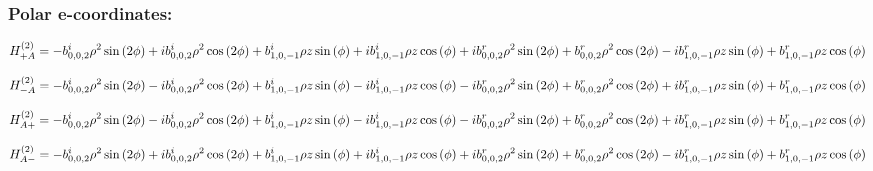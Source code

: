\documentclass[fleqn]{article}
\begin{document}
\subsubsection*{Polar e-coordinates:}

\begin{dmath*}
H_{+A}^{(2)}=- b^{i}_{0,0,2} \rho^{2} \sin{\left (2 \phi \right )} +  i b^{i}_{0,0,2} \rho^{2} \cos{\left (2 \phi \right )} + b^{i}_{1,0,-1} \rho z \sin{\left (\phi \right )} +  i b^{i}_{1,0,-1} \rho z \cos{\left (\phi \right )} +  i b^{r}_{0,0,2} \rho^{2} \sin{\left (2 \phi \right )} + b^{r}_{0,0,2} \rho^{2} \cos{\left (2 \phi \right )} -  i b^{r}_{1,0,-1} \rho z \sin{\left (\phi \right )} + b^{r}_{1,0,-1} \rho z \cos{\left (\phi \right )}\\
\end{dmath*}

\begin{dmath*}
H_{-A}^{(2)}=- b^{i}_{0,0,2} \rho^{2} \sin{\left (2 \phi \right )} -  i b^{i}_{0,0,2} \rho^{2} \cos{\left (2 \phi \right )} + b^{i}_{1,0,-1} \rho z \sin{\left (\phi \right )} -  i b^{i}_{1,0,-1} \rho z \cos{\left (\phi \right )} -  i b^{r}_{0,0,2} \rho^{2} \sin{\left (2 \phi \right )} + b^{r}_{0,0,2} \rho^{2} \cos{\left (2 \phi \right )} +  i b^{r}_{1,0,-1} \rho z \sin{\left (\phi \right )} + b^{r}_{1,0,-1} \rho z \cos{\left (\phi \right )}\\
\end{dmath*}

\begin{dmath*}
H_{A+}^{(2)}=- b^{i}_{0,0,2} \rho^{2} \sin{\left (2 \phi \right )} -  i b^{i}_{0,0,2} \rho^{2} \cos{\left (2 \phi \right )} + b^{i}_{1,0,-1} \rho z \sin{\left (\phi \right )} -  i b^{i}_{1,0,-1} \rho z \cos{\left (\phi \right )} -  i b^{r}_{0,0,2} \rho^{2} \sin{\left (2 \phi \right )} + b^{r}_{0,0,2} \rho^{2} \cos{\left (2 \phi \right )} +  i b^{r}_{1,0,-1} \rho z \sin{\left (\phi \right )} + b^{r}_{1,0,-1} \rho z \cos{\left (\phi \right )}\\
\end{dmath*}

\begin{dmath*}
H_{A-}^{(2)}=- b^{i}_{0,0,2} \rho^{2} \sin{\left (2 \phi \right )} +  i b^{i}_{0,0,2} \rho^{2} \cos{\left (2 \phi \right )} + b^{i}_{1,0,-1} \rho z \sin{\left (\phi \right )} +  i b^{i}_{1,0,-1} \rho z \cos{\left (\phi \right )} +  i b^{r}_{0,0,2} \rho^{2} \sin{\left (2 \phi \right )} + b^{r}_{0,0,2} \rho^{2} \cos{\left (2 \phi \right )} -  i b^{r}_{1,0,-1} \rho z \sin{\left (\phi \right )} + b^{r}_{1,0,-1} \rho z \cos{\left (\phi \right )}\\
\end{dmath*}
\end{document}
